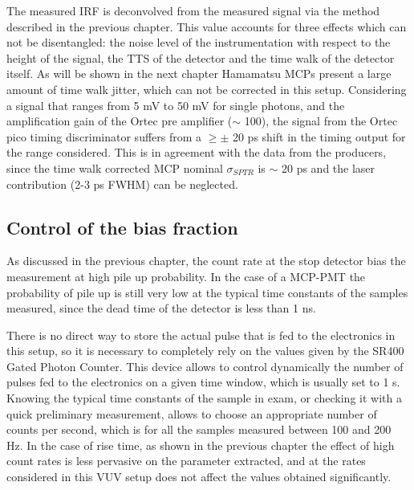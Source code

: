 The measured IRF is deconvolved from the measured signal via the method described in the previous chapter.
This value accounts for three effects which can not be disentangled: the noise level of the instrumentation with respect to the height of the signal, the TTS of the detector and the time walk of the detector itself.
As will be shown in the next chapter Hamamatsu MCPs present a large amount of time walk jitter, which can not be corrected in this setup. Considering a signal that ranges from 5 mV to 50 mV for single photons, and the amplification gain of the Ortec pre amplifier ($\sim$ 100), the signal from the Ortec pico timing discriminator suffers from a $\geq\pm$ 20 ps shift in the timing output for the range considered.
This is in agreement with the data from the producers, since the time walk corrected MCP nominal $\sigma _{SPTR}$ is $\sim$ 20 ps and the laser contribution (2-3 ps FWHM) can be neglected.

\subsection{Control of the bias fraction}

As discussed in the previous chapter, the count rate at the stop detector bias the measurement at high pile up probability. In the case of a MCP-PMT the probability of pile up is still very low at the typical time constants of the samples measured, since the dead time of the detector is less than 1 ns. 

There is no direct way to store the actual pulse that is fed to the electronics in this setup, so it is necessary to completely rely on the values given by the SR400 Gated Photon Counter. 
This device allows to control dynamically the number of pulses fed to the electronics on a given time window, which is usually set to 1 s. Knowing the typical time constants of the sample in exam, or checking it with a quick preliminary measurement, allows to choose an appropriate number of counts per second, which is for all the samples measured between 100 and 200 Hz.
In the case of rise time, as shown in the previous chapter the effect of high count rates is less pervasive on the parameter extracted, and at the rates considered in this VUV setup does not affect the values obtained significantly.


